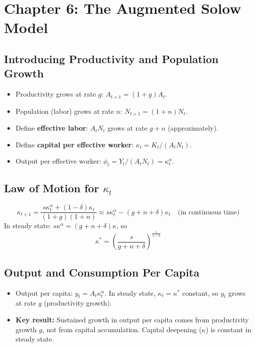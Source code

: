 \documentclass[12pt]{article}
\begin{document}
\section{Chapter 6: The Augmented Solow Model}

\subsection{Introducing Productivity and Population Growth}
\begin{itemize}
    \item Productivity grows at rate $g$: $A_{t+1} = (1+g) A_t$.
    \item Population (labor) grows at rate $n$: $N_{t+1} = (1+n) N_t$.
    \item Define \textbf{effective labor}: $A_t N_t$ grows at rate $g + n$ (approximately).
    \item Define \textbf{capital per effective worker}: $\kappa_t = K_t / (A_t N_t)$.
    \item Output per effective worker: $\phi_t = Y_t / (A_t N_t) = \kappa_t^{\alpha}$.
\end{itemize}

\subsection{Law of Motion for $\kappa_t$}
\begin{equation}
    \kappa_{t+1} = \frac{s \kappa_t^{\alpha} + (1-\delta) \kappa_t}{(1+g)(1+n)} \approx s \kappa_t^{\alpha} - (g + n + \delta) \kappa_t \quad \text{(in continuous time)}
\end{equation}
In steady state: $s \kappa^{\alpha} = (g + n + \delta) \kappa$, so
\begin{equation}
    \kappa^* = \left( \frac{s}{g + n + \delta} \right)^{\frac{1}{1-\alpha}}
\end{equation}

\subsection{Output and Consumption Per Capita}
\begin{itemize}
    \item Output per capita: $y_t = A_t \kappa_t^{\alpha}$. In steady state, $\kappa_t = \kappa^*$ constant, so $y_t$ grows at rate $g$ (productivity growth).
    \item \textbf{Key result:} Sustained growth in output per capita comes from productivity growth $g$, not from capital accumulation. Capital deepening ($\kappa$) is constant in steady state.
\end{itemize}
\end{document}
